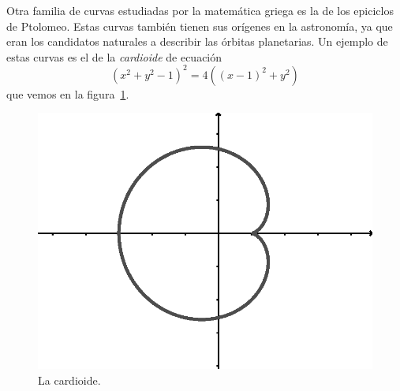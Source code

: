 Otra familia de curvas estudiadas por la matemática griega es la de los
epiciclos de Ptolomeo. Estas curvas también tienen sus orígenes en la
astronomía, ya que eran los candidatos naturales a describir las órbitas
planetarias. Un ejemplo de estas curvas es el de la \emph{cardioide} de ecuación
\[
	(x^2+y^2-1)^2=4( (x-1)^2+y^2)
\]
que vemos en la figura~\ref{fig:cardioide}.

\begin{figure}
   \centering
   \includegraphics[scale=0.5]{images/cardioid}
   \caption{La cardioide.}
   \label{fig:cardioide}
\end{figure}
 

